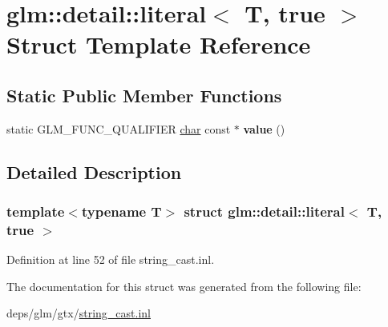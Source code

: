\hypertarget{structglm_1_1detail_1_1literal_3_01T_00_01true_01_4}{}\section{glm\+:\+:detail\+:\+:literal$<$ T, true $>$ Struct Template Reference}
\label{structglm_1_1detail_1_1literal_3_01T_00_01true_01_4}
\subsection*{Static Public Member Functions}
\begin{DoxyCompactItemize}
\item 
\mbox{\label{structglm_1_1detail_1_1literal_3_01T_00_01true_01_4_ae18b91cfeeb373f6b7c62572f88cf239}} 
static G\+L\+M\+\_\+\+F\+U\+N\+C\+\_\+\+Q\+U\+A\+L\+I\+F\+I\+ER \hyperlink{classchar}{char} const  $\ast$ {\bfseries value} ()
\end{DoxyCompactItemize}


\subsection{Detailed Description}
\subsubsection*{template$<$typename T$>$\newline
struct glm\+::detail\+::literal$<$ T, true $>$}



Definition at line 52 of file string\+\_\+cast.\+inl.



The documentation for this struct was generated from the following file\+:\begin{DoxyCompactItemize}
\item 
deps/glm/gtx/\hyperlink{string__cast_8inl}{string\+\_\+cast.\+inl}\end{DoxyCompactItemize}
